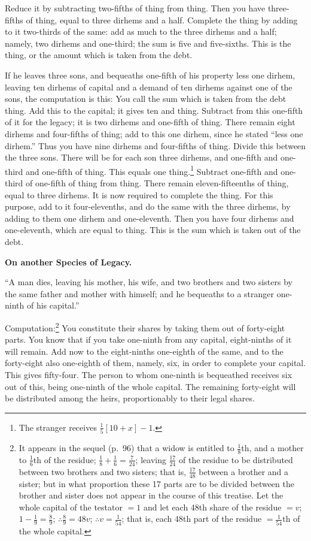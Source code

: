 Reduce it by subtracting two-fifths of thing from thing. Then you have three-fifths of thing, equal to three dirhems and a half. Complete the thing by adding to it two-thirds of the same: add as much to the three dirhems and a half; namely, two dirhems and one-third; the sum is five and five-sixths. This is the thing, or the amount which is taken from the debt.

If he leaves three sons, and bequeaths one-fifth of his property less one dirhem, leaving ten dirhems of capital and a demand of ten dirhems against one of the sons, the computation is this: You call the sum which is taken from the debt thing. Add this to the capital; it gives ten and thing. Subtract from this one-fifth of it for the legacy; it is two dirhems and one-fifth of thing. There remain eight dirhems and four-fifths of thing; add to this one dirhem, since he stated ``less one dirhem.'' Thus you have nine dirhems and four-fifths of thing. Divide this between the three sons. There will be for each son three dirhems, and one-fifth and one-third and one-fifth of thing. This equals one thing.\footnote{The stranger receives $\frac{1}{5}[10+x] - 1$.} Subtract one-fifth and one-third of one-fifth of thing from thing. There remain eleven-fifteenths of thing, equal to three dirhems. It is now required to complete the thing. For this purpose, add to it four-elevenths, and do the same with the three dirhems, by adding to them one dirhem and one-eleventh. Then you have four dirhems and one-eleventh, which are equal to thing. This is the sum which is taken out of the debt.

\vspace{0.3cm}
\noindent\textbf{On another Species of Legacy.}

``A man dies, leaving his mother, his wife, and two brothers and two sisters by the same father and mother with himself; and he bequeaths to a stranger one-ninth of his capital.''

Computation:\footnote{It appears in the sequel (p.~96) that a widow is entitled to $\frac{1}{8}$th, and a mother to $\frac{1}{6}$th of the residue; $\frac{1}{8} + \frac{1}{6} = \frac{7}{24}$; leaving $\frac{17}{24}$ of the residue to be distributed between two brothers and two sisters; that is, $\frac{17}{48}$ between a brother and a sister; but in what proportion these 17 parts are to be divided between the brother and sister does not appear in the course of this treatise. Let the whole capital of the testator $= 1$ and let each 48th share of the residue $= v$; $1 - \frac{1}{9} = \frac{8}{9}$; $\therefore \frac{8}{9} = 48v$; $\therefore v = \frac{1}{54}$; that is, each 48th part of the residue $= \frac{1}{54}$th of the whole capital.} You constitute their shares by taking them out of forty-eight parts. You know that if you take one-ninth from any capital, eight-ninths of it will remain. Add now to the eight-ninths one-eighth of the same, and to the forty-eight also one-eighth of them, namely, six, in order to complete your capital. This gives fifty-four. The person to whom one-ninth is bequeathed receives six out of this, being one-ninth of the whole capital. The remaining forty-eight will be distributed among the heirs, proportionably to their legal shares.

